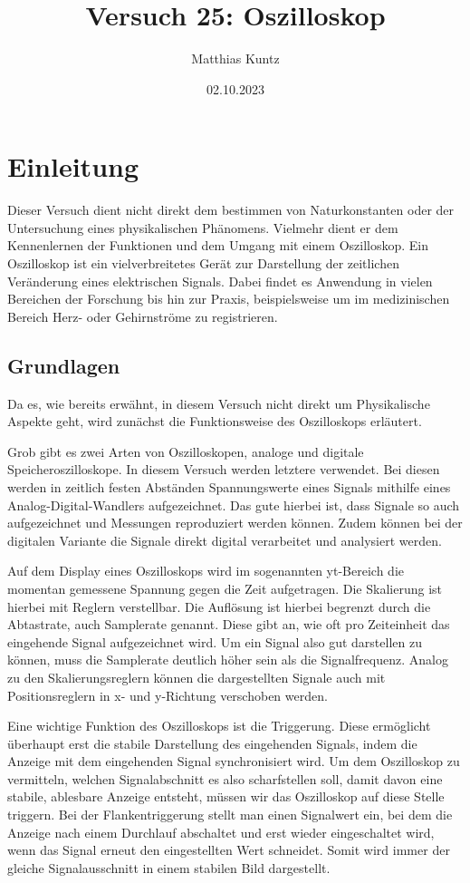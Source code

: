 \documentclass{article}
\title{Versuch 25: Oszilloskop}
\author{Matthias Kuntz}
\date{02.10.2023}
\begin{document}
\maketitle

\section{Einleitung}

Dieser Versuch dient nicht direkt dem bestimmen von Naturkonstanten oder der Untersuchung eines physikalischen Phänomens. Vielmehr dient er dem Kennenlernen der Funktionen und dem Umgang mit einem Oszilloskop. Ein Oszilloskop ist ein vielverbreitetes Gerät zur Darstellung der zeitlichen Veränderung eines elektrischen Signals. Dabei findet es Anwendung in vielen Bereichen der Forschung bis hin zur Praxis, beispielsweise um im medizinischen Bereich Herz- oder Gehirnströme zu registrieren. 

\subsection{Grundlagen}

Da es, wie bereits erwähnt, in diesem Versuch nicht direkt um Physikalische Aspekte geht, wird zunächst die Funktionsweise des Oszilloskops erläutert. 

Grob gibt es zwei Arten von Oszilloskopen, analoge und digitale Speicheroszilloskope. In diesem Versuch werden letztere verwendet. Bei diesen werden in zeitlich festen Abständen Spannungswerte eines Signals mithilfe eines Analog-Digital-Wandlers aufgezeichnet. Das gute hierbei ist, dass Signale so auch aufgezeichnet und Messungen reproduziert werden können. Zudem können bei der digitalen Variante die Signale direkt digital verarbeitet und analysiert werden. 

Auf dem Display eines Oszilloskops wird im sogenannten yt-Bereich die momentan gemessene Spannung gegen die Zeit aufgetragen. Die Skalierung ist hierbei mit Reglern verstellbar. Die Auflösung ist hierbei begrenzt durch die Abtastrate, auch Samplerate genannt. Diese gibt an, wie oft pro Zeiteinheit das eingehende Signal aufgezeichnet wird. Um ein Signal also gut darstellen zu können, muss die Samplerate deutlich höher sein als die Signalfrequenz. Analog zu den Skalierungsreglern können die dargestellten Signale auch mit Positionsreglern in x- und y-Richtung verschoben werden.

Eine wichtige Funktion des Oszilloskops ist die Triggerung. Diese ermöglicht überhaupt erst die stabile Darstellung des eingehenden Signals, indem die Anzeige mit dem eingehenden Signal synchronisiert wird. Um dem Oszilloskop zu vermitteln, welchen Signalabschnitt es also scharfstellen soll, damit davon eine stabile, ablesbare Anzeige entsteht, müssen wir das Oszilloskop auf diese Stelle triggern. Bei der Flankentriggerung stellt man einen Signalwert ein, bei dem die Anzeige nach einem Durchlauf abschaltet und erst wieder eingeschaltet wird, wenn das Signal erneut den eingestellten Wert schneidet. Somit wird immer der gleiche Signalausschnitt in einem stabilen Bild dargestellt. 
\end{document}
